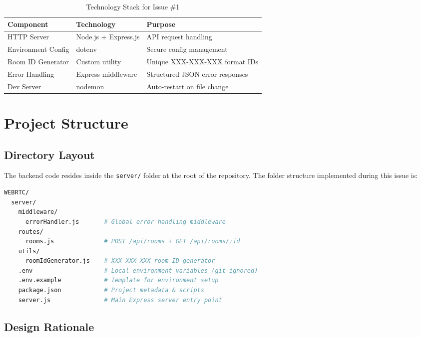 \documentclass[11pt,a4paper]{article}
\begin{document}
\begin{table}[h!]
\centering
\begin{tabular}{@{}lll@{}}
\toprule
\textbf{Component} & \textbf{Technology} & \textbf{Purpose} \\ \midrule
HTTP Server         & Node.js + Express.js   & API request handling \\
Environment Config  & dotenv                 & Secure config management \\
Room ID Generator   & Custom utility         & Unique XXX-XXX-XXX format IDs \\
Error Handling      & Express middleware      & Structured JSON error responses \\
Dev Server          & nodemon                & Auto-restart on file change \\ \bottomrule
\end{tabular}
\caption{Technology Stack for Issue \#1}
\label{tab:tech_stack}
\end{table}

\section{Project Structure}

\subsection{Directory Layout}

The backend code resides inside the \texttt{server/} folder at the root of the repository. The folder structure implemented during this issue is:

\begin{lstlisting}[language=bash, caption={Backend Folder Structure}, label={lst:folder}]
WEBRTC/
  server/
    middleware/
      errorHandler.js       # Global error handling middleware
    routes/
      rooms.js              # POST /api/rooms + GET /api/rooms/:id
    utils/
      roomIdGenerator.js    # XXX-XXX-XXX room ID generator
    .env                    # Local environment variables (git-ignored)
    .env.example            # Template for environment setup
    package.json            # Project metadata & scripts
    server.js               # Main Express server entry point
\end{lstlisting}

\subsection{Design Rationale}
\end{document}
